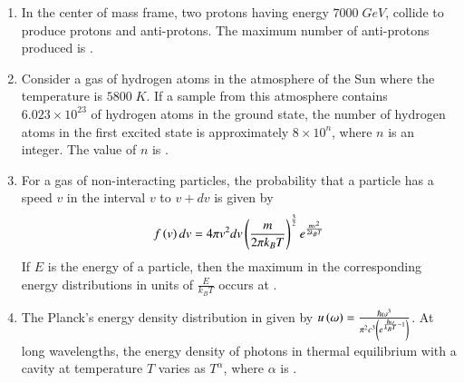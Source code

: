 \documentclass[journal,12pt,onecolumn]{IEEEtran}
\theoremstyle{remark}
\begin{document}
\begin{enumerate}[start=53]
\item In the center of mass frame, two protons having energy $7000\;GeV$, collide to produce protons and anti-protons. The maximum number of anti-protons produced is \underline{\hspace{2cm}}.\\ 
\item Consider a gas of hydrogen atoms in the atmosphere of the Sun where the temperature is $5800\;K$. If a sample from this atmosphere contains $6.023\times10^{23}$ of hydrogen atoms in the ground state, the number of hydrogen atoms in the first excited state is approximately $8\times 10^n$, where $n$ is an integer. The value of $n$ is \underline{\hspace{2cm}}.\\
\item For a gas of non-interacting particles, the probability that a particle has a speed $v$ in the interval $v$ to $v+dv$ is given by $$f\left(v\right)dv=4\pi v^2dv\left(\frac{m}{2\pi k_BT}\right)^{\frac{3}{2}}e^{\frac{mv^2}{2k_BT}}$$ If $E$ is the energy of a particle, then the maximum in the corresponding energy distributions in units of $\frac{E}{k_BT}$ occurs at \underline{\hspace{2cm}} .
\item The Planck's energy density distribution in given by $u\left(\omega\right)=\frac{\hbar \omega^3}{\pi^2 c^3 \left(e^{\frac{\hbar \omega}{k_BT}-1}\right)}$. At long wavelengths, the energy density of photons in thermal equilibrium with a cavity at temperature $T$ varies as $T^{\alpha}$, where $\alpha$ is \underline{\hspace{2cm}}.
\end{enumerate}
\end{document}
